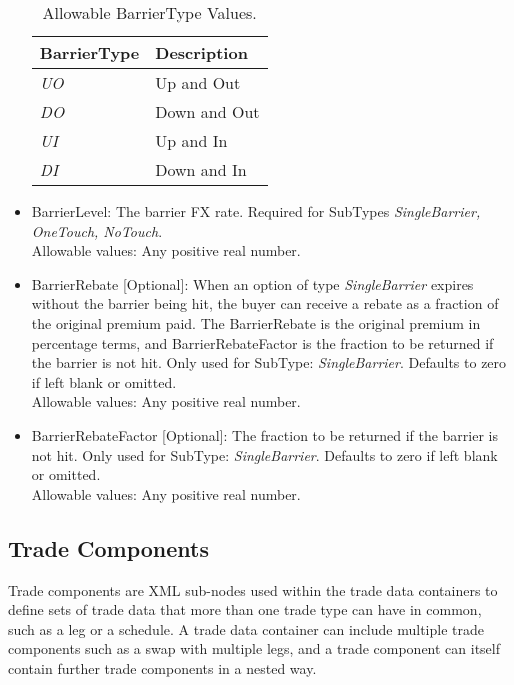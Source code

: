 \begin{itemize}
\begin{table}[H]
\centering
  \begin{tabu} to 0.9\linewidth {| X[-1.5,l,m] | X[-5,l,m] |}
    \hline
    \bfseries{BarrierType} & \bfseries{Description} \\
    \hline
    \emph{UO} & Up and Out\\ \hline
    \emph{DO} & Down and Out\\ \hline
    \emph{UI} & Up and In \\ \hline
    \emph{DI} & Down and In\\ \hline    
  \end{tabu}
  \caption{Allowable BarrierType Values.}
  \label{tab:fxoption_barriertype}
\end{table}

\item BarrierLevel: The barrier FX rate.  Required for SubTypes \emph{SingleBarrier, OneTouch, NoTouch}. \\ Allowable values:  Any positive real number.
\item BarrierRebate [Optional]:  When an option of type  \emph{SingleBarrier} expires without the barrier being hit, the buyer can receive a rebate as a fraction of the original premium paid. The BarrierRebate is the original premium in percentage terms, and BarrierRebateFactor is the fraction to be returned if the barrier is not hit. Only used for SubType: \emph{SingleBarrier}. Defaults to zero if left blank or omitted.  \\ Allowable values:  Any positive real number.
\item BarrierRebateFactor [Optional]: The fraction to be returned if the barrier is not hit. Only used for SubType: \emph{SingleBarrier}. Defaults to zero if left blank or omitted. \\ Allowable values:  Any positive real number.
\end{itemize}

\subsection{Trade Components}

Trade components are XML sub-nodes used within the trade data containers to define sets of trade data that more than one trade type can have in common, such as a leg or a schedule. A trade data container can include multiple trade components such as a swap with multiple legs, and a trade component can itself contain further trade components in a nested way. 

